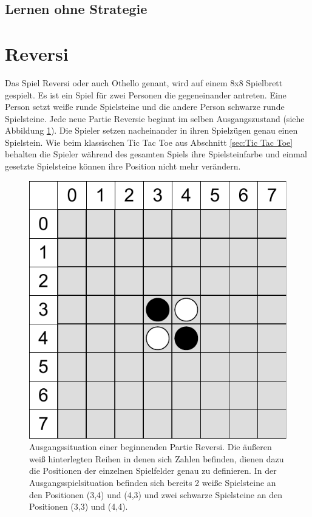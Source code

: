 \subsection{Lernen ohne Strategie}
\label{subsec:Lernen ohne Strategie}

\section{Reversi}
Das Spiel Reversi oder auch Othello genant, wird auf einem 8x8 Spielbrett gespielt. Es ist ein Spiel für zwei Personen die gegeneinander antreten. Eine Person setzt weiße runde Spielsteine und die andere Person schwarze runde Spielsteine. Jede neue Partie Reversie beginnt im selben Ausgangszustand (siehe Abbildung \ref{fig:ausgangssituation_reversi}). Die Spieler setzen nacheinander in ihren Spielzügen genau einen Spielstein. Wie beim klassischen Tic Tac Toe aus Abschnitt \ref{sec:Tic Tac Toe} behalten die Spieler während des gesamten Spiels ihre Spielsteinfarbe und einmal gesetzte Spielsteine können ihre Position nicht mehr verändern. \\

\begin{figure}[!htbp]
  \centering
  \includegraphics[scale=0.5]{inhalt/abbildungen/ausgangssituation_reversi.pdf}
  \caption{Ausgangssituation einer beginnenden Partie Reversi. Die äußeren weiß hinterlegten Reihen in denen sich Zahlen befinden, dienen dazu die Positionen der einzelnen Spielfelder genau zu definieren. In der Ausgangsspielsituation befinden sich bereits 2 weiße Spielsteine an den Positionen (3,4) und (4,3) und zwei schwarze Spielsteine an den Positionen (3,3) und (4,4).}
  \label{fig:ausgangssituation_reversi}
\end{figure}

